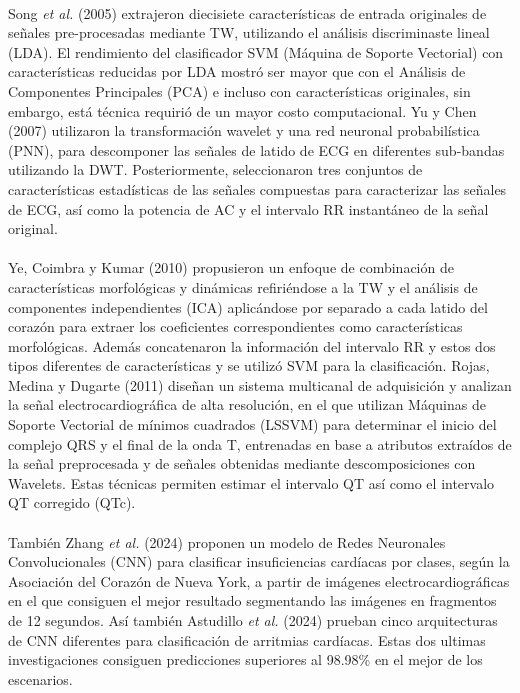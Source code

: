 \documentclass[spanish,11pt,letterpaper,oneside]{memoir}
\begin{document}
    \\
    Song \textit{et al.} (2005) \cite{Song05} extrajeron diecisiete características de entrada originales de señales pre-procesadas mediante TW, utilizando el análisis discriminaste lineal (LDA). El rendimiento del clasificador SVM (Máquina de Soporte Vectorial) con características reducidas por LDA mostró ser mayor que con el Análisis de Componentes Principales (PCA) e incluso con características originales, sin embargo, está técnica requirió de un mayor costo computacional. Yu y Chen (2007) \cite{Yu07} utilizaron la transformación wavelet y una red neuronal probabilística (PNN), para descomponer las señales de latido de ECG en diferentes sub-bandas utilizando la DWT. Posteriormente, seleccionaron tres conjuntos de características estadísticas de las señales compuestas para caracterizar las señales de ECG, así como la potencia de AC y el intervalo RR instantáneo de la señal original.\\
\\
    Ye, Coimbra y Kumar (2010) \cite{Ye10} propusieron un enfoque de combinación de características morfológicas y dinámicas refiriéndose a la TW y el análisis de componentes independientes (ICA) aplicándose por separado a cada latido del corazón para extraer los coeficientes correspondientes como características morfológicas. Además concatenaron la información del intervalo RR y estos dos tipos diferentes de características y se utilizó SVM para la clasificación. Rojas, Medina y Dugarte (2011) \cite{Dugarte11} diseñan un sistema multicanal de adquisición y analizan la señal electrocardiográfica de alta resolución, en el que utilizan Máquinas de Soporte Vectorial de mínimos cuadrados (LSSVM) para determinar el inicio del complejo QRS y el final de la onda T, entrenadas en base a atributos extraídos de la señal preprocesada y de señales obtenidas mediante descomposiciones con Wavelets. Estas técnicas permiten estimar el intervalo QT así como el intervalo QT corregido (QTc).\\
    \\
    También Zhang \textit{et al.} (2024) \cite{Zhang24} proponen un modelo de Redes Neuronales Convolucionales (CNN) para clasificar insuficiencias cardíacas por clases, según la Asociación del Corazón de Nueva York, a partir de imágenes electrocardiográficas en el que consiguen el mejor resultado segmentando las imágenes en fragmentos de 12 segundos. Así también Astudillo \textit{et al.} (2024) \cite{Astudillo24} prueban cinco arquitecturas de CNN diferentes para clasificación de arritmias cardíacas. Estas dos ultimas investigaciones consiguen predicciones superiores al 98.98\% en el mejor de los escenarios. \\
\end{document}
